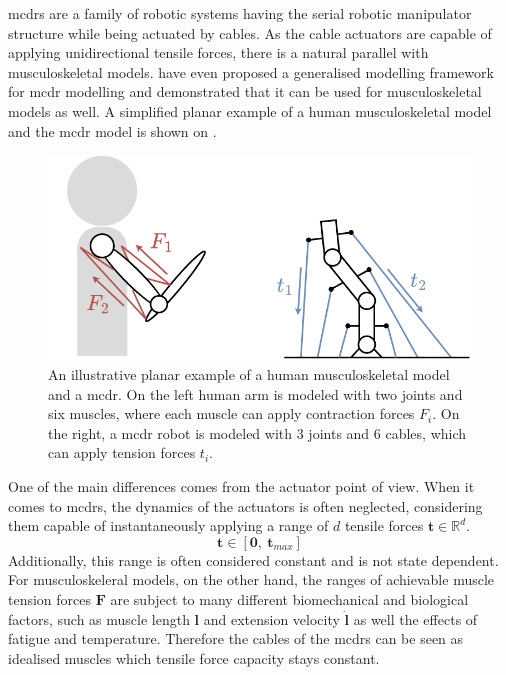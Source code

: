 \glspl{mcdr} \cite{Wang2019} are a family of robotic systems having the serial robotic manipulator structure while being actuated by cables. As the cable actuators are capable of applying unidirectional tensile forces, there is a natural parallel with musculoskeletal models. \citet{Lau2013} have even proposed a generalised modelling framework for \gls{mcdr} modelling  and demonstrated that it can be used for musculoskeletal models as well. A simplified planar example of a human musculoskeletal model and the \gls{mcdr} model is shown on .

\begin{figure}
    \centering
    \includegraphics[width=\linewidth]{Chapters/imgs/muscle_mcdrs.png}
    \caption{An illustrative planar example of a human musculoskeletal model and a \gls{mcdr}. On the left human arm is modeled with two joints and six muscles, where each muscle can apply contraction forces $F_i$. On the right, a \gls{mcdr} robot is modeled with 3 joints and 6 cables, which can apply tension forces $t_i$.  }
    \label{fig:muscle_mcdrs}
\end{figure}




One of the main differences comes from the actuator point of view. When it comes to \glspl{mcdr}, the dynamics of the actuators is often neglected, considering them capable of instantaneously applying a range of $d$ tensile forces $\bm{t}\in\mathbb{R}^d$.
\begin{equation}
    \bm{t} \in [\bm{0},~\bm{t}_{max}]
\end{equation}
Additionally, this range is often considered constant and is not state dependent. For musculoskeleral models, on the other hand, the ranges of achievable muscle tension forces $\bm{F}$ are subject to many different biomechanical and biological factors, such as muscle length $\bm{l}$ and extension velocity $\dot{\bm{l}}$ as well the effects of fatigue and temperature.
Therefore the cables of the \glspl{mcdr} can be seen as idealised muscles which tensile force capacity stays constant. 

